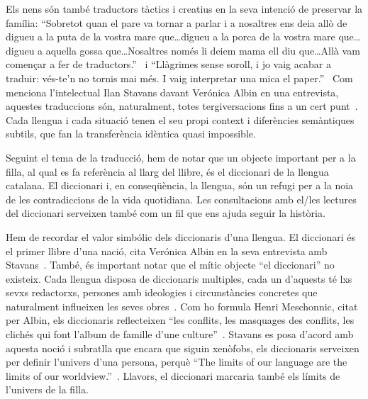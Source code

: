 Els nens són també traductors tàctics i creatius en la seva intenció de preservar la família:
``Sobretot quan el pare va tornar a parlar i a nosaltres ens deia allò de digueu a la puta de la vostra mare que\ldots digueu a la porca de la vostra mare que\ldots digueu a aquella gossa que\ldots Nosaltres només li deiem mama ell diu que\ldots Allà vam començar a fer de traductors.''~\autocite[177]{ElHachmi2008}
i ``Llàgrimes sense soroll, i jo vaig acabar a traduir: vés-te'n  no tornis mai més. I vaig interpretar una mica el paper.''~\autocite[223--224]{ElHachmi2008}
Com menciona l'intelectual Ilan Stavans davant Verónica Albin en una entrevista, aquestes traduccions són, naturalment, totes tergiversacions fins a un cert punt~\autocite{Albin2005}.
Cada llengua i cada situació tenen el seu propi context i diferències semàntiques subtils, que fan la transferència idèntica quasi impossible.

Seguint el tema de la traducció, hem de notar que
un objecte important per a la filla, al qual es fa referència al llarg del llibre, és el diccionari de la llengua catalana.
El diccionari i, en conseqüència, la llengua, són un refugi per a la noia de les contradiccions de la vida quotidiana.
Les consultacions amb el/les lectures del diccionari serveixen també com un fil que ens ajuda seguir la història.

Hem de recordar el valor simbólic dels diccionaris d'una llengua.
El diccionari és el primer llibre d'una nació, cita Verónica Albin en la seva entrevista amb Stavans~\autocite{Albin2005}.
També, és important notar que el mític objecte ``el diccionari'' no existeix.
Cada llengua disposa de diccionaris multiples, cada un d'aquests té lxs sevxs redactorxs, persones amb ideologies i circunstàncies concretes que naturalment influeixen les seves obres~\autocite{Albin2005}.
Com ho formula Henri Meschonnic, citat per Albin, els diccionaris reflecteixen ``les conflits, les masquages des
conflits, les clichés qui font l'album de famille d'une culture''~\autocite{Albin2005}.
Stavans es posa d'acord amb aquesta noció i subratlla que encara que siguin xenòfobs, els diccionaris serveixen per definir l'univers d'una persona,
perquè ``The limits of our language are the limits of our worldview.''~\autocite{Albin2005}.
Llavors, el diccionari marcaria també els límits de l'univers de la filla.

